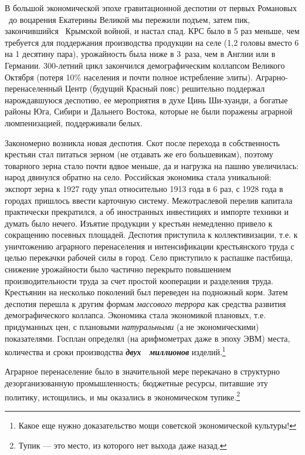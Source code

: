 В большой экономической эпохе гравитационной деспотии от первых Романовых \ до воцарения Екатерины Великой мы
пережили подъем, затем пик, закончившийся \ Крымской войной, и настал спад. КРС было в 5 раз меньше, чем требуется для
поддержания производства продукции на селе (1,2 головы вместо 6 на 1 десятину пара), урожайность была ниже в 3~раза,
чем в Англии или в Германии. 300\nobreakdash-летний цикл закончился демографическим коллапсом Великого Октября (потеря
10\% населения и почти полное истребление элиты). Аграрно-перенаселенный Центр (будущий Красный пояс) решительно
поддержал нарождавшуюся деспотию, ее мероприятия в духе Цинь Ши-хуанди, а богатые районы Юга, Сибири и Дальнего
Востока, которые не были поражены аграрной люмпенизацией, поддерживали белых.

Закономерно возникла новая деспотия. Скот после перехода в собственность крестьян стал питаться зерном (не отдавать же
его большевикам), поэтому товарного зерна стало почти вдвое меньше, да и нагрузка на пашню увеличилась: народ двинулся
обратно на село. Российская экономика стала уникальной: экспорт зерна к 1927 году упал относительно 1913 года в 6 раз,
с 1928 года в городах пришлось ввести карточную систему. Межотраслевой перелив капитала практически прекратился, а об
иностранных инвестициях и импорте техники и думать было нечего. Изъятие продукции у крестьян немедленно привело к
сокращению посевных площадей. Деспотия приступила к коллективизации, т.е. к уничтожению аграрного перенаселения и
интенсификации крестьянского труда с целью перекачки рабочей силы в город. Село приступило к распашке пастбища,
снижение урожайности было частично перекрыто повышением производительности труда за счет простой кооперации и
разделения труда. Крестьянин на несколько поколений был переведен на подножный корм. Затем деспотия перешла к другим
формам \textit{массового} \textit{террора }как средства развития демографического коллапса. Экономика стала экономикой
плановых, т.е. придуманных цен, с плановыми \textit{натуральными} (а не экономическими) показателями. Госплан определял
(на арифмометрах даже в эпоху ЭВМ) места, количества и сроки производства \textbf{\textit{двух \ миллионов}}
изделий.\footnote{Какое еще нужно доказательство мощи советской экономической культуры!}


Аграрное перенаселение было в значительной мере перекачано в структурно дезорганизованную промышленность; бюджетные
ресурсы, питавшие эту политику, истощились, и мы оказались в экономическом тупике.\footnote{Тупик — это
место, из которого нет выхода даже назад.}

